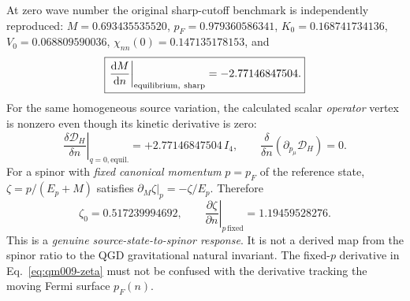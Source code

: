 \documentclass[11pt,a4paper]{article}
\begin{document}
At zero wave number the original sharp-cutoff benchmark is independently reproduced: $M=0.693435535520$, $p_F=0.979360586341$, $K_0=0.168741734136$, $V_0=0.068809590036$, $\chi_{nn}(0)=0.147135178153$, and
\begin{equation}\label{eq:qm009-numerics}
\boxed{\left.\frac{\dd M}{\dd n}\right|_{\rm equilibrium,\ sharp}=-2.77146847504.}
\end{equation}
For the same homogeneous source variation, the calculated scalar \emph{operator} vertex is nonzero even though its kinetic derivative is zero:
\begin{equation}\label{eq:qm009-opvertex}
\boxed{\left.\frac{\delta\mathcal D_H}{\delta n}\right|_{q=0,\mathrm{equil.}}=+2.77146847504\,I_4,\qquad\frac{\delta}{\delta n}\left(\partial_{p_\mu}\mathcal D_H\right)=0.}
\end{equation}
For a spinor with \emph{fixed canonical momentum} $p=p_F$ of the reference state, $\zeta=p/(E_p+M)$ satisfies $\partial_M\zeta|_p=-\zeta/E_p$. Therefore
\begin{equation}\label{eq:qm009-zeta}
\boxed{\zeta_0=0.517239994692,\qquad \left.\frac{\partial\zeta}{\partial n}\right|_{p\,\mathrm{fixed}}=1.19459528276.}
\end{equation}
This is a \emph{genuine source-state-to-spinor response}. It is not a derived map from the spinor ratio to the QGD gravitational natural invariant. The fixed-$p$ derivative in Eq.~\eqref{eq:qm009-zeta} must not be confused with the derivative tracking the moving Fermi surface $p_F(n)$.
\end{document}
